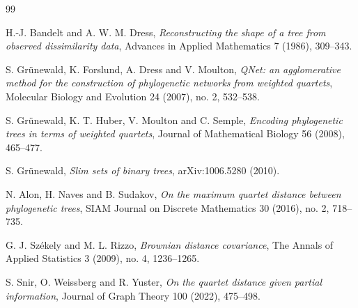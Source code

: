 \documentclass[11pt]{article}
\begin{document}
\begin{thebibliography}{99}

H.-J. Bandelt and A. W. M. Dress,
\emph{Reconstructing the shape of a tree from observed dissimilarity data},
Advances in Applied Mathematics 7 (1986), 309--343.

S. Gr\"unewald, K. Forslund, A. Dress and V. Moulton,
\emph{QNet: an agglomerative method for the construction of phylogenetic networks from weighted quartets},
Molecular Biology and Evolution 24 (2007), no. 2, 532--538.

S. Gr\"unewald, K. T. Huber, V. Moulton and C. Semple,
\emph{Encoding phylogenetic trees in terms of weighted quartets},
Journal of Mathematical Biology 56 (2008), 465--477.

S. Gr\"unewald,
\emph{Slim sets of binary trees},
arXiv:1006.5280 (2010).

N. Alon, H. Naves and B. Sudakov,
\emph{On the maximum quartet distance between phylogenetic trees},
SIAM Journal on Discrete Mathematics 30 (2016), no. 2, 718--735.


G. J. Sz\'ekely and M. L. Rizzo,
\emph{Brownian distance covariance},
The Annals of Applied Statistics 3 (2009), no. 4, 1236--1265.

S. Snir, O. Weissberg and R. Yuster,
\emph{On the quartet distance given partial information},
Journal of Graph Theory 100 (2022), 475--498.


\end{thebibliography}
\end{document}
